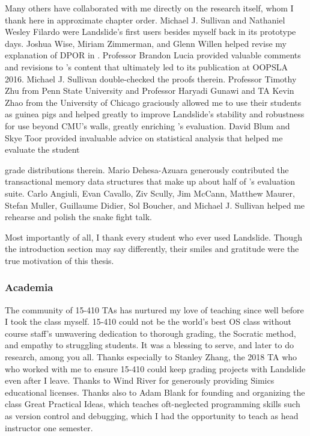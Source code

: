 \documentclass[12pt]{cmuthesis}
\begin{document}
\begin{acknowledgments}
{{Many others have collaborated with me directly on the research itself,
whom I thank here in approximate chapter order.
Michael J. Sullivan and Nathaniel Wesley Filardo were Landslide's first users besides myself back in its prototype days.
Joshua Wise, Miriam Zimmerman, and Glenn Willen helped revise my explanation of DPOR in .
Professor Brandon Lucia provided valuable comments and revisions to 's content
that ultimately led to its publication at OOPSLA 2016.
Michael J. Sullivan double-checked the proofs therein.
Professor Timothy Zhu from Penn State University
and Professor Haryadi Gunawi and TA Kevin Zhao from the University of Chicago
graciously allowed me to use their students as guinea pigs
and helped greatly to improve Landslide's stability and robustness for use beyond CMU's walls,
greatly enriching 's evaluation.
David Blum and Skye Toor provided
invaluable advice on statistical analysis
that helped me evaluate the student
\unskip\parfillskip 0pt \par}

\pagebreak

\noindent
grade distributions therein.
Mario Dehesa-Azuara generously contributed the
transactional memory data structures
that make up about half of 's evaluation suite.
%
Carlo Angiuli, Evan Cavallo, Ziv Scully, Jim McCann,
Matthew Maurer, Stefan Muller, Guillaume Didier,
Sol Boucher, and Michael J. Sullivan
helped me rehearse and polish the snake fight talk.

Most importantly of all, I thank every student who ever used Landslide.
Though the introduction section may say differently,
their smiles and gratitude were the true motivation of this thesis.

\subsubsection{Academia}

The community of 15-410 TAs
has nurtured my love of teaching
since well before I took the class myself.
15-410 could not be the world's best OS class
without %
course staff's %
unwavering dedication to
thorough grading, the Socratic method,
and empathy to struggling students.
It was a blessing to serve, and later to do research, among you all.
Thanks especially to Stanley Zhang,
the 2018 TA who who worked with me to ensure
15-410 could keep grading projects with Landslide even after I leave.
Thanks to Wind River for generously
providing
Simics educational licenses.
Thanks also to Adam Blank %
for founding and organizing the class Great Practical Ideas,
which teaches oft-neglected programming skills such as version control and debugging,
which I had the opportunity to teach as head instructor one semester.

}
\end{acknowledgments}
\end{document}
